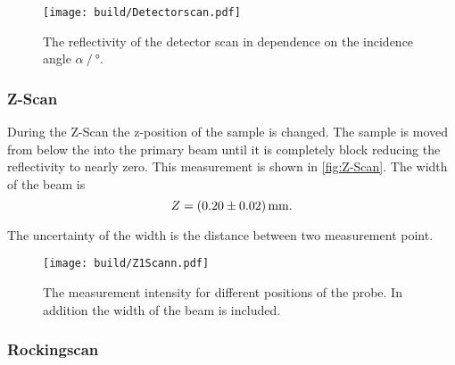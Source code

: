 \begin{figure}[H]
    \centering
    \texttt{[image: build/Detectorscan.pdf]}
    \caption{The reflectivity of the detector scan in dependence on the incidence angle $\alpha \mathbin{/} \unit{\degree}$.}
    \label{fig:Detectorscan}
\end{figure}

\subsubsection{Z-Scan}

During the Z-Scan the z-position of the sample is changed. 
The sample is moved from below the into the primary beam until it is completely block reducing the reflectivity to nearly zero.
This measurement is shown in \autoref{fig:Z-Scan}.
The width of the beam is 
\begin{equation*}
    Z = \SI{0.2 \pm 0.02}{\milli\meter}.
\end{equation*}

The uncertainty of the width is the distance between two measurement point.

\begin{figure}[H]
    \centering
    \texttt{[image: build/Z1Scann.pdf]}
    \caption{The measurement intensity for different positions of the probe. In addition the width of the beam is included.} 
    \label{fig:Z-Scan}
\end{figure}



\subsubsection{Rockingscan}